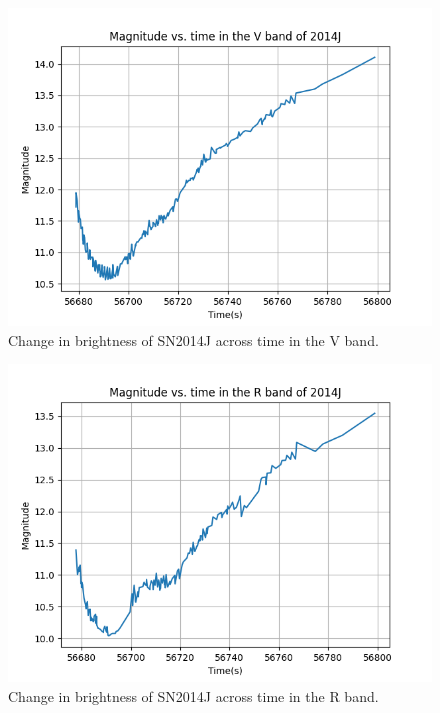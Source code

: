 \begin{figure}[h]
	\includegraphics[width=1.0\textwidth]{2014J_V_magvstime.png}
	\caption{Change in brightness of SN2014J across time in the V band.}
\end{figure}
\begin{figure}[h]
	\includegraphics[width=1.0\textwidth]{2014J_R_magvstime.png}
	\caption{Change in brightness of SN2014J across time in the R band.}
\end{figure}
